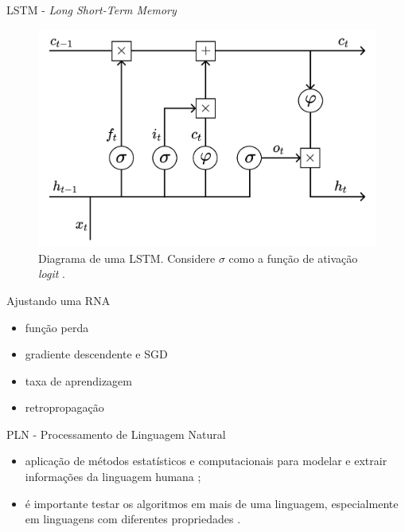 \documentclass{beamer}
\begin{document}
    \begin{frame}{LSTM - \textit{Long Short-Term Memory}}
       \begin{figure}
            \centering
            \includegraphics[scale=0.25]{figuras/lstm_cell.pdf}
	        \caption{Diagrama de uma LSTM. Considere $\sigma$ como a função de ativação \textit{logit} \citep[adaptado de][]{kamath2019}.}
        \end{figure}
    \end{frame}

    \begin{frame}{Ajustando uma RNA}
        \begin{itemize}
            \item função perda
            \item gradiente descendente e SGD
            \item taxa de aprendizagem
            \item retropropagação
        \end{itemize}
    \end{frame}

    \begin{frame}{PLN - Processamento de Linguagem Natural}
        \begin{itemize}
            \justifying
            \item aplicação de métodos estatísticos e computacionais para modelar e extrair informações da linguagem humana \citep{kamath2019};
            \item é importante testar os algoritmos em mais de uma linguagem, especialmente em linguagens com diferentes propriedades \citep{jurafsky2021}.
        \end{itemize}
    \end{frame}
\end{document}
